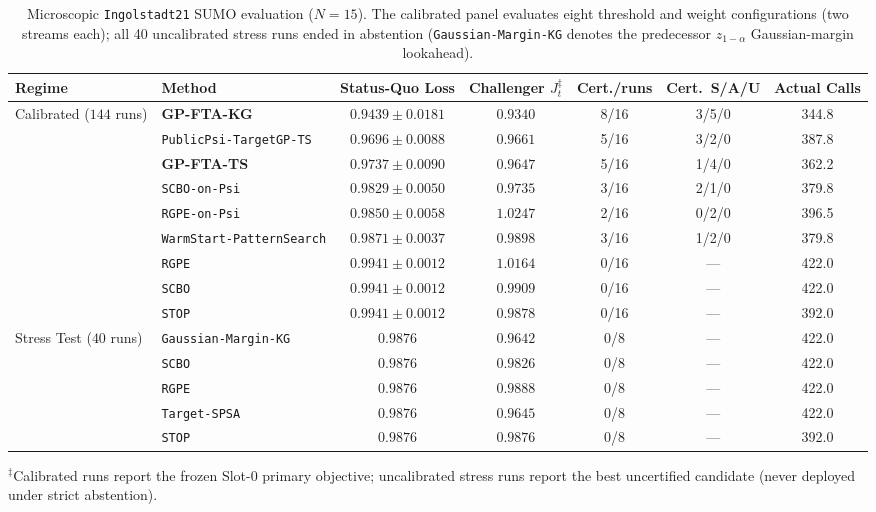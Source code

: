 \begin{table}[htbp]
\centering
\caption{Microscopic \texttt{Ingolstadt21} SUMO evaluation ($N=15$). The calibrated panel evaluates eight threshold and weight configurations (two streams each); all 40 uncalibrated stress runs ended in abstention (\texttt{Gaussian-Margin-KG} denotes the predecessor $z_{1-\alpha}$ Gaussian-margin lookahead).}\label{tab:live_sumo}
\scriptsize
\setlength{\tabcolsep}{4.6pt}
\begin{tabular}{llccccc}
\toprule
\textbf{Regime} & \textbf{Method} & \textbf{Status-Quo Loss} & \textbf{Challenger $J_t^{\ddagger}$} & \textbf{Cert./runs} & \textbf{Cert.\ S/A/U} & \textbf{Actual Calls} \\
\midrule
\multirow{9}{*}{Calibrated ($144$ runs)} & \textbf{GP-FTA-KG} & $\mathbf{0.9439} \pm 0.0181$ & $0.9340$ & 8/16 & 3/5/0 & 344.8 \\
 & \texttt{PublicPsi-TargetGP-TS} & $0.9696 \pm 0.0088$ & $0.9661$ & 5/16 & 3/2/0 & 387.8 \\
 & \textbf{GP-FTA-TS} & $0.9737 \pm 0.0090$ & $0.9647$ & 5/16 & 1/4/0 & 362.2 \\
 & \texttt{SCBO-on-Psi} & $0.9829 \pm 0.0050$ & $0.9735$ & 3/16 & 2/1/0 & 379.8 \\
 & \texttt{RGPE-on-Psi} & $0.9850 \pm 0.0058$ & $1.0247$ & 2/16 & 0/2/0 & 396.5 \\
 & \texttt{WarmStart-PatternSearch} & $0.9871 \pm 0.0037$ & $0.9898$ & 3/16 & 1/2/0 & 379.8 \\
 & \texttt{RGPE} & $0.9941 \pm 0.0012$ & $1.0164$ & 0/16 & --- & 422.0 \\
 & \texttt{SCBO} & $0.9941 \pm 0.0012$ & $0.9909$ & 0/16 & --- & 422.0 \\
 & \texttt{STOP} & $0.9941 \pm 0.0012$ & $0.9878$ & 0/16 & --- & 392.0 \\
\midrule
\multirow{5}{*}{Stress Test ($40$ runs)} & \texttt{Gaussian-Margin-KG} & $0.9876$ & $0.9642$ & 0/8 & --- & 422.0 \\
 & \texttt{SCBO} & $0.9876$ & $0.9826$ & 0/8 & --- & 422.0 \\
 & \texttt{RGPE} & $0.9876$ & $0.9888$ & 0/8 & --- & 422.0 \\
 & \texttt{Target-SPSA} & $0.9876$ & $0.9645$ & 0/8 & --- & 422.0 \\
 & \texttt{STOP} & $0.9876$ & $0.9876$ & 0/8 & --- & 392.0 \\
\bottomrule
\end{tabular}
\par\smallskip\parbox{\textwidth}{\scriptsize $^{\ddagger}$Calibrated runs report the frozen Slot-0 primary objective; uncalibrated stress runs report the best uncertified candidate (never deployed under strict abstention).}
\end{table}